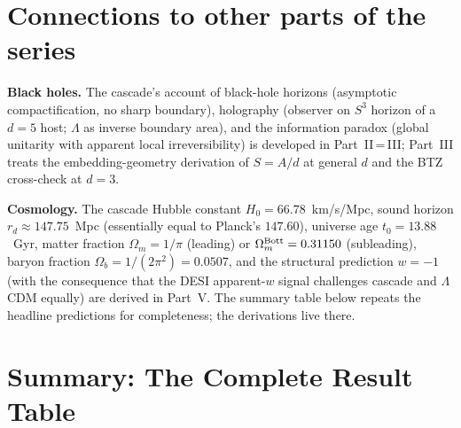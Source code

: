 \documentclass[12pt,a4paper]{article}
\begin{document}
\section{Connections to other parts of the series}\label{sec:connections-to-other-parts-of-the-series}

\textbf{Black holes.} The cascade's account of black-hole horizons (asymptotic compactification, no sharp boundary), holography (observer on $S^3$ horizon of a $d=5$ host; $\Lambda$ as inverse boundary area), and the information paradox (global unitarity with apparent local irreversibility) is developed in Part~II\,=\,III; Part~III treats the embedding-geometry derivation of $S = A/d$ at general $d$ and the BTZ cross-check at $d=3$.

\textbf{Cosmology.} The cascade Hubble constant $H_0 = 66.78$~km/s/Mpc, sound horizon $r_d \approx 147.75$~Mpc (essentially equal to Planck's $147.60$), universe age $t_0 = 13.88$~Gyr, matter fraction $\Omega_m = 1/\pi$ (leading) or $\Omega_m^{\rm Bott} = 0.31150$ (subleading), baryon fraction $\Omega_b = 1/(2\pi^2) = 0.0507$, and the structural prediction $w = -1$ (with the consequence that the DESI apparent-$w$ signal challenges cascade and $\Lambda$CDM equally) are derived in Part~V. The summary table below repeats the headline predictions for completeness; the derivations live there.

\section{Summary: The Complete Result Table}\label{sec:summary-the-complete-result-table}
\end{document}

